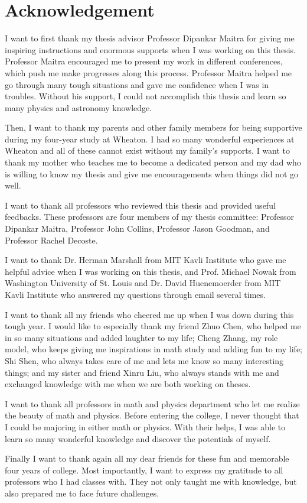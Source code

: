 \chapter{Acknowledgement}
I want to first thank my thesis advisor Professor
Dipankar Maitra for giving me inspiring instructions and enormous supports when I was working on this thesis.  Professor Maitra encouraged me to present my work in different conferences, which push me make progresses along this process. Professor Maitra helped me go through many tough situations and gave me confidence when I was in troubles. Without his support, I could not accomplish this thesis and learn so many physics and astronomy knowledge.

Then, I want to thank my parents and other family members for being supportive during my four-year study at Wheaton. I had so many wonderful experiences at Wheaton and all of these cannot exist without my family's supports. I want to thank my mother who teaches me to become a dedicated person and my dad who is willing to know my thesis and give me encouragements when things did not go well. 

I want to thank all professors who
reviewed this thesis and provided useful feedbacks.
These professors are four members of my thesis committee: Professor Dipankar Maitra, Professor John Collins,
Professor Jason Goodman, and Professor Rachel Decoste.

I want to thank Dr. Herman Marshall from MIT Kavli Institute who gave me helpful advice when I was working on this thesis, and Prof. Michael Nowak from Washington University of St. Louis and Dr. David Huenemoerder from MIT Kavli Institute who answered my questions through email several times.

I want to thank all my friends who cheered me up when I was down during this tough year. I would like to especially thank my friend Zhuo Chen, who helped me in so many situations and added laughter to my life; Cheng Zhang, my role model, who keeps giving me inspirations in math study and adding fun to my life; Shi Shen, who always takes care of me and lets me know so many interesting things; and my sister and friend Xinru Liu, who always stands with me and exchanged knowledge with me when we are both working on theses.

I want to thank all professors in math and physics department who let me realize the beauty of math and physics. Before entering the college, I never thought that I could be majoring in either math or physics. With their helps, I was able to learn so many wonderful knowledge and discover the potentials of myself.

Finally I want to thank again all my dear friends
for these fun and memorable four years of college.
Most importantly, I want to express my gratitude to all professors who I had classes with. They not only taught me with knowledge, but also prepared me to face future challenges.